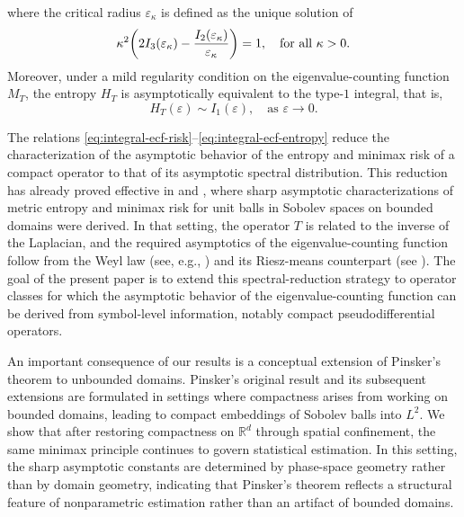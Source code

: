 \documentclass[a4paper,12pt]{article}
\let\originalleft\left
\let\originalright\right
\renewcommand{\left}{\mathopen{}\mathclose\bgroup\originalleft}
\renewcommand{\right}{\aftergroup\egroup\originalright}
\newcommand{\R}{\mathbb{R}}
\begin{document}
where the critical radius $\varepsilon_\kappa$ is defined as the unique solution of
\begin{equation}\label{eq:def-critical-radius}
    \kappa^2 \left(2I_3(\varepsilon_\kappa) - \frac{I_2(\varepsilon_\kappa)}{\varepsilon_\kappa}\right)=1,
    \quad \text{for all } \kappa > 0.
\end{equation}
Moreover, under a mild regularity condition on the eigenvalue-counting function $M_T$,
the %
entropy $H_T$ is asymptotically equivalent to the type-$1$ integral, that is, 
\begin{equation}\label{eq:integral-ecf-entropy}
    H_T(\varepsilon) 
    \sim  I_1(\varepsilon),
    \quad \text{as } \varepsilon \rightarrow 0.
\end{equation}


The relations \eqref{eq:integral-ecf-risk}--\eqref{eq:integral-ecf-entropy} reduce the characterization of the asymptotic behavior of the %
entropy and minimax risk of a compact operator to that of its asymptotic spectral distribution. 
This reduction has already proved effective in \cite[Section~3.2]{ab2025compactoperators} and \cite[Section~5]{allard2025metricentropyminimaxrisk}, where sharp asymptotic characterizations of metric entropy and minimax risk for unit balls in Sobolev spaces on bounded domains were derived.
In that setting, the operator $T$ is related to the inverse of the Laplacian, and the required asymptotics of the eigenvalue-counting function follow from the Weyl law (see, e.g., \cite[Chapter~9.5]{shubinInvitationPartialDifferential2020}) and its Riesz-means counterpart (see \cite{frank2024riesz}).
The goal of the present paper is to extend this spectral-reduction strategy to operator classes for which the asymptotic behavior of the eigenvalue-counting function can be derived from symbol-level information, notably compact pseudodifferential operators.

An important consequence of our results is a conceptual extension of Pinsker’s
theorem \cite{pinsker1980optimal} to unbounded domains. Pinsker’s original result
and its subsequent extensions are formulated in settings where compactness
arises from working on bounded domains, leading to compact embeddings of Sobolev
balls into $L^2$. We show that after restoring compactness on $\R^d$ through
spatial confinement, the same minimax principle continues to govern statistical
estimation. In this setting, the sharp asymptotic constants are determined by
phase-space geometry rather than by domain geometry, indicating that Pinsker’s
theorem reflects a structural feature of nonparametric estimation rather than an
artifact of bounded domains.
\end{document}
